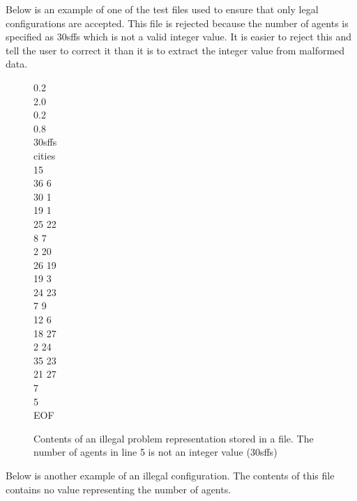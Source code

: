 Below is an example of one of the test files used to ensure that only legal configurations are accepted. This file is rejected because the number of agents is specified as 30sffs which is not a valid integer value. It is easier to reject this and tell the user to correct it than it is to extract the integer value from malformed data.

\begin{figure}[H]
0.2 \\
2.0 \\
0.2 \\
0.8 \\
30sffs \\
cities \\
15 \\
36 6 \\
30 1 \\
19 1 \\
25 22 \\
8 7 \\
2 20 \\
26 19 \\
19 3 \\
24 23 \\
7 9 \\
12 6 \\
18 27 \\
2 24 \\
35 23 \\
21 27 \\
7 \\
5 \\
EOF
\caption[Illegal File contents - Number Format execption]{Contents of an illegal problem representation stored in a file. The number of agents in line 5 is not an integer value (30sffs)}
\label{invalidConfigagentsNFE}
\end{figure}

Below is another example of an illegal configuration. The contents of this file contains no value representing the number of agents.

